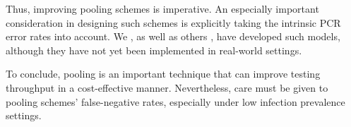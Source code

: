 \documentclass{article}
\begin{document}
Thus, improving pooling schemes is imperative. An especially important
consideration in designing such schemes is explicitly taking the
intrinsic PCR error rates into account. We \cite{DOPE}, as well as
others \cite{BayesianDorfman}, have developed such models, although
they have not yet been implemented in real-world settings.

To conclude, pooling is an important technique that can improve
testing throughput in a cost-effective manner. Nevertheless, care must
be given to pooling schemes' false-negative rates, especially under
low infection prevalence settings.



\end{document}
